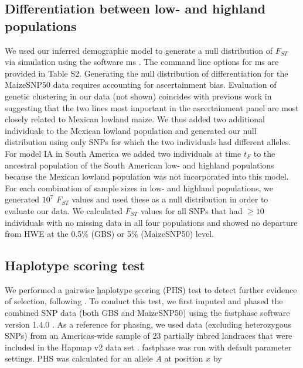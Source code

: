 \subsection*{Differentiation between low- and highland populations}
We used our inferred demographic model to generate a null distribution of $F_{ST}$ via simulation using the software {\sf ms} \cite[]{Hudson_2002_11847089}.   
The command line options for {\sf ms} are provided in Table S2.  Generating the null distribution of differentiation for the MaizeSNP50 data requires accounting for ascertainment bias. Evaluation of genetic clustering in our data (not shown) coincides with previous work \cite[]{Hufford_2012_22660546} in suggesting that the two lines most important in the ascertainment panel are most closely related to Mexican lowland maize.  
We thus added two additional individuals to the Mexican lowland population and generated our null distribution using only SNPs for which the two individuals had different alleles. For model IA in South America we added two individuals at time $t_F$ to the ancestral population of the South American low- and highland populations because the Mexican lowland population was not incorporated into this model. For each combination of sample sizes in low- and highland populations, we generated $10^7$ $F_{ST}$ values and used these as a null distribution in order to evaluate our data.   We calculated $F_{ST}$ values for all SNPs that had $\geq10$ individuals with no missing data in all four populations and showed no departure from HWE at the 0.5\% (GBS) or 5\% (MaizeSNP50) level. 

\subsection*{Haplotype scoring test}
We performed a \underline{p}airwise \underline{h}aplotype \underline{s}coring (PHS) test to detect further evidence of selection, following \cite{Toomajian_2006_16623598}.  
To conduct this test, we first imputed and phased the combined SNP data (both GBS and MaizeSNP50) using the {\sf fastphase} software version 1.4.0 \cite[]{Scheet_2006_16532393}.  
As a reference for phasing, we used data (excluding heterozygous SNPs) from an Americas-wide sample of 23 partially inbred landraces that were included in the Hapmap v2 data set  \cite[]{Chia_2012_22660545}.  
{\sf fastphase} was run with default parameter settings.  PHS was calculated for an allele \emph{A} at position $x$ by


